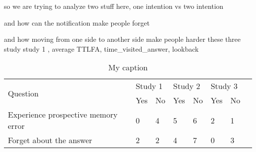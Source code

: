 so we are trying to analyze two stuff here,
one intention vs two intention



and how can the notification make people forget


and how moving from one side to another side make people harder
these three study
study 1 , average TTLFA, time_visited_answer, lookback



\begin{table}[]
\centering
\caption{My caption}
\label{my-label}
\begin{tabular}{|l|l|l|l|l|l|l|l}
\cline{1-7}
\multirow{2}{*}{Question}           & \multicolumn{2}{l|}{Study 1} & \multicolumn{2}{l|}{Study 2} & \multicolumn{2}{l|}{Study 3} &  \\ \cline{2-7}
                                    & Yes           & No           & Yes           & No           & Yes           & No           &  \\ \cline{1-7}
Experience prospective memory error & 0             & 4            & 5             & 6            & 2             & 1            &  \\ \cline{1-7}
Forget about the answer             & 2             & 2            & 4             & 7            & 0             & 3            &  \\ \cline{1-7}
\end{tabular}
\end{table}

